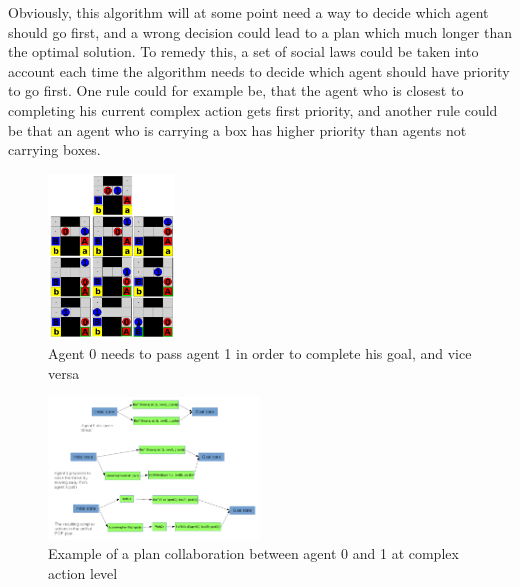 \documentclass[Main]{subfiles}
\begin{document}
Obviously, this algorithm will at some point need a way to decide which agent should go first, and a wrong decision could lead to a plan which much longer than the optimal solution.
To remedy this, a set of social laws could be taken into account each time the algorithm needs to decide which agent should have priority to go first.
One rule could for example be, that the agent who is closest to completing his current complex action gets first priority, and another rule could be that an agent who is carrying a box has higher priority than agents not carrying boxes.

\begin{figure}[h!]
	\centering
	\includegraphics[width=0.3\textwidth]{plan_collab.png}
	\caption{Agent 0 needs to pass agent 1 in order to complete his goal, and vice versa}
	\label{fig:plan_collab}
\end{figure}

\begin{figure}[h!]
	\centering
	\includegraphics[width=0.5\textwidth]{unhtnpop.png}
	\caption{Example of a plan collaboration between agent 0 and 1 at complex action level}
	\label{fig:htn_collab}
\end{figure}
\end{document}
